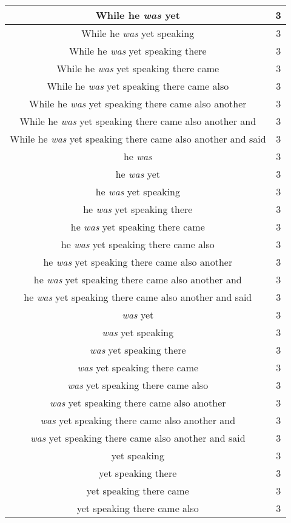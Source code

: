 \begin{center}
\begin{longtable}{|c|c|}
While he \emph{was} yet & 3\\ \hline 
While he \emph{was} yet speaking & 3\\ \hline 
While he \emph{was} yet speaking there & 3\\ \hline 
While he \emph{was} yet speaking there came & 3\\ \hline 
While he \emph{was} yet speaking there came also & 3\\ \hline 
While he \emph{was} yet speaking there came also another & 3\\ \hline 
While he \emph{was} yet speaking there came also another and & 3\\ \hline 
While he \emph{was} yet speaking there came also another and said & 3\\ \hline 
he \emph{was} & 3\\ \hline 
he \emph{was} yet & 3\\ \hline 
he \emph{was} yet speaking & 3\\ \hline 
he \emph{was} yet speaking there & 3\\ \hline 
he \emph{was} yet speaking there came & 3\\ \hline 
he \emph{was} yet speaking there came also & 3\\ \hline 
he \emph{was} yet speaking there came also another & 3\\ \hline 
he \emph{was} yet speaking there came also another and & 3\\ \hline 
he \emph{was} yet speaking there came also another and said & 3\\ \hline 
\emph{was} yet & 3\\ \hline 
\emph{was} yet speaking & 3\\ \hline 
\emph{was} yet speaking there & 3\\ \hline 
\emph{was} yet speaking there came & 3\\ \hline 
\emph{was} yet speaking there came also & 3\\ \hline 
\emph{was} yet speaking there came also another & 3\\ \hline 
\emph{was} yet speaking there came also another and & 3\\ \hline 
\emph{was} yet speaking there came also another and said & 3\\ \hline 
yet speaking & 3\\ \hline 
yet speaking there & 3\\ \hline 
yet speaking there came & 3\\ \hline 
yet speaking there came also & 3\\ \hline 

\end{longtable}
\end{center}
